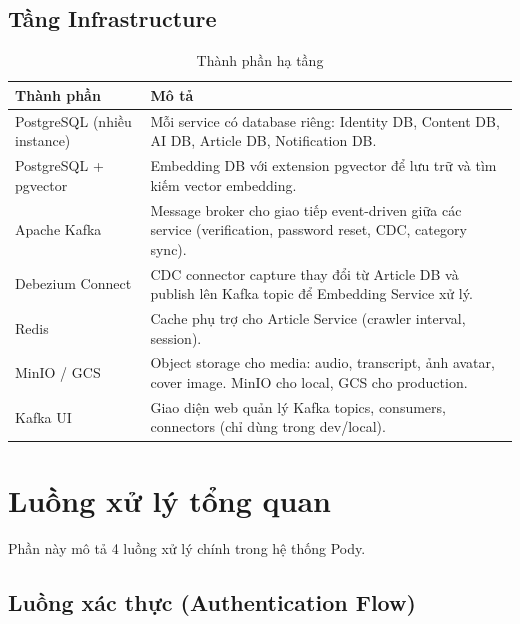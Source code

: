 \documentclass[14pt,a4paper,oneside]{extreport}
\begin{document}
\subsection{Tầng Infrastructure}

\begin{table}[H]
\centering
\caption{Thành phần hạ tầng}
\label{tab:infrastructure}
\renewcommand{\arraystretch}{1.3}
\small
\begin{tabularx}{\textwidth}{|l|X|}
\hline
\textbf{Thành phần} & \textbf{Mô tả} \\
\hline
PostgreSQL (nhiều instance) &
  Mỗi service có database riêng: Identity DB, Content DB, AI DB, Article DB, Notification DB. \\
\hline
PostgreSQL + pgvector &
  Embedding DB với extension pgvector để lưu trữ và tìm kiếm vector embedding. \\
\hline
Apache Kafka &
  Message broker cho giao tiếp event-driven giữa các service (verification, password reset, CDC, category sync). \\
\hline
Debezium Connect &
  CDC connector capture thay đổi từ Article DB và publish lên Kafka topic để Embedding Service xử lý. \\
\hline
Redis &
  Cache phụ trợ cho Article Service (crawler interval, session). \\
\hline
MinIO / GCS &
  Object storage cho media: audio, transcript, ảnh avatar, cover image. MinIO cho local, GCS cho production. \\
\hline
Kafka UI &
  Giao diện web quản lý Kafka topics, consumers, connectors (chỉ dùng trong dev/local). \\
\hline
\end{tabularx}
\end{table}


\section{Luồng xử lý tổng quan}
\label{sec:luong-xu-ly}

Phần này mô tả 4 luồng xử lý chính trong hệ thống Pody.

\subsection{Luồng xác thực (Authentication Flow)}
\end{document}
